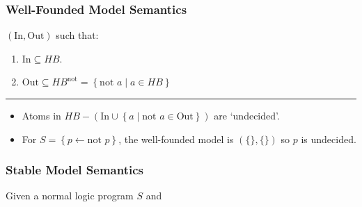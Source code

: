 \documentclass[twocolumn,english]{article}
\begin{document}
\subsubsection{Well-Founded Model Semantics}

$\left(\text{In},\text{Out}\right)$ such that:
\begin{enumerate}
\item $\text{In}\subseteq HB$.
\item $\text{Out}\subseteq HB^{\text{not}}=\left\{ \text{not }a\mid a\in HB\right\} $
\end{enumerate}
\rule[0.5ex]{0.25\columnwidth}{0.5pt}
\begin{itemize}
\item Atoms in $HB-\left(\text{In}\cup\left\{ a\mid\text{not }a\in\text{Out}\right\} \right)$
are `undecided'.
\item For $S=\left\{ p\leftarrow\text{not }p\right\} $, the well-founded
model is $\left(\{\},\{\}\right)$ so $p$ is undecided.
\end{itemize}

\subsubsection{Stable Model Semantics}

Given a normal logic program $S$ and 
\end{document}
